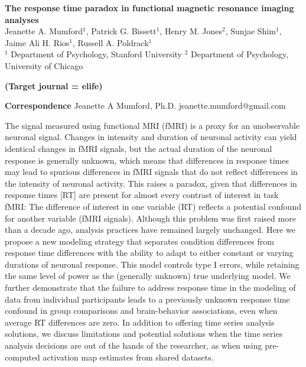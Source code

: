 \documentclass[titlepage,12pt] {article}
\begin{document}
\begin{titlepage}
\begin{center}
{\large\textbf{The response time paradox in functional magnetic resonance imaging analyses
}}\\
{Jeanette A. Mumford$^1$, Patrick G. Bissett$^1$, Henry M. Jones$^2$, Sunjae Shim$^1$, Jaime Ali H. Rios$^1$, Russell A. Poldrack$^1$\\
  \small{$^1$} Department of Psychology, Stanford University 
  \small{$^2$} Department of Psychology, University of Chicago}
\end{center}


\textbf{(Target journal = elife)}

\vspace{2.8in}
\begin{singlespace}
  \hspace{0.1in}\newline
\textbf{Correspondence}\newline 
Jeanette A Mumford, Ph.D. \newline 
jeanette.mumford@gmail.com \newline
\end{singlespace}

\newpage
{}


The signal measured using functional MRI (fMRI) is a proxy for an unobservable neuronal signal. Changes in intensity and duration of neuronal activity can yield identical changes in fMRI signals, but the actual duration of the neuronal response is generally unknown, which means that differences in response times may lead to spurious differences in fMRI signals that do not reflect differences in the intensity of neuronal activity.  This raises a paradox, given that differences in response times [RT] are present for almost every contrast of interest in task fMRI: The difference of interest in one variable (RT) reflects a potential confound for another variable (fMRI signals).  Although this problem was first raised more than a decade ago, analysis practices have remained largely unchanged.  Here we propose a new modeling strategy that separates condition differences from response time differences with the ability to adapt to either constant or varying durations of neuronal response.  This model controls type I errors, while retaining the same level of power as the (generally unknown) true underlying model.  We further demonstrate that the failure to address response time in the modeling of data from individual participants leads to a previously unknown response time confound in group comparisons and brain-behavior associations, even when average RT differences are zero.  In addition to offering time series analysis solutions, we discuss limitations and potential solutions when the time series analysis decisions are out of the hands of the researcher, as when using pre-computed activation map estimates from shared datasets.


\vspace{.1in}


\end{titlepage}
\end{document}
